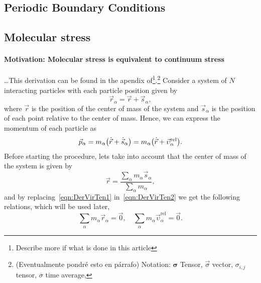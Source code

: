 \subsection{Periodic Boundary Conditions}

\subsection{Molecular stress}


\paragraph{Motivation: Molecular stress is equivalent to continuum stress} \dots This derivation can be found in the apendix of\citep{admalUnifiedInterpretationStress2010}\footnote{Describe more if what is done in this article}.\footnote{(Eventualmente pondré esto en párrafo) Notation:
    $\bm{\sigma}$ Tensor, $\vec{\sigma}$ vector, $\sigma_{i,j}$ tensor, $\overline{\sigma}$ time average, 
}
Consider a system of $N$ interacting particles with each particle position given by
\begin{equation}
    \vec{r}_{\alpha} = \vec{r} + \vec{s}_{\alpha}\label{eqn:DerVirTen1},
\end{equation}
where $\vec{r}$ is the position of the center of mass of the system and $\vec{s}_\alpha$ is the position of each point relative to the center of mass.
Hence, we can express the momentum of each particle as
\begin{equation}
    \vec{p}_\alpha = m_\alpha\qty(\dot{\vec{r}}+\dot{\vec{s}}_\alpha) = m_\alpha\qty(\dot{\vec{r}}+\vec{\upsilon}_\alpha^{\mathrm{rel}}).\label{eqn:DerVirTen2}
\end{equation}
Before starting the procedure, lets take into account that the center of mass of the system is given by
\begin{equation}
    \vec{r} = \frac{\sum_{\alpha}m_\alpha\vec{s}_\alpha}{\sum_{\alpha}m_\alpha}\label{eqn:DerVirTen3},
\end{equation}
and by replacing~\eqref{eqn:DerVirTen1} in~\eqref{eqn:DerVirTen2} we get the following relations, which will be used later,
\begin{equation}
    \sum_\alpha m_\alpha\vec{r}_\alpha = \vec{0},\quad
    \sum_\alpha m_\alpha\vec{\upsilon}_\alpha^{\mathrm{rel}} = \vec{0}.\label{eqn:DerVirTen4}
\end{equation}


